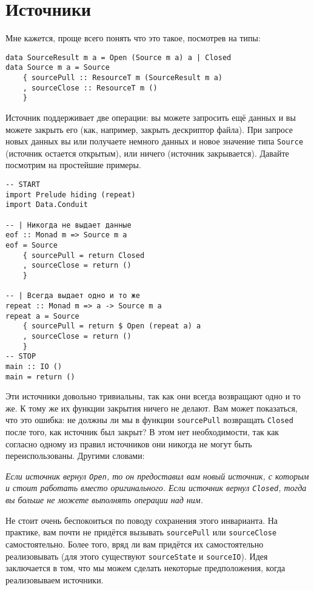 \section{Источники}

Мне кажется, проще всего понять что это такое, посмотрев на типы:
\begin{lstlisting}
data SourceResult m a = Open (Source m a) a | Closed
data Source m a = Source
    { sourcePull :: ResourceT m (SourceResult m a)
    , sourceClose :: ResourceT m ()
    }
\end{lstlisting}
Источник поддерживает две операции: вы можете запросить ещё данных и вы можете закрыть его (как,
например, закрыть дескриптор файла). При запросе новых данных вы или получаете немного
данных и новое значение типа \lstinline=Source= (источник остается открытым), или
ничего (источник закрывается). Давайте посмотрим на простейшие примеры.
\begin{lstlisting}
-- START
import Prelude hiding (repeat)
import Data.Conduit

-- | Никогда не выдает данные
eof :: Monad m => Source m a
eof = Source
    { sourcePull = return Closed
    , sourceClose = return ()
    }

-- | Всегда выдает одно и то же
repeat :: Monad m => a -> Source m a
repeat a = Source
    { sourcePull = return $ Open (repeat a) a
    , sourceClose = return ()
    }
-- STOP
main :: IO ()
main = return ()
\end{lstlisting}
Эти источники довольно тривиальны, так как они всегда возвращают одно и то же. К тому
же их функции закрытия ничего не делают. Вам может показаться, что это ошибка: не должны ли 
мы в функции \lstinline=sourcePull= возвращать \lstinline=Closed= после того, как
источник был
закрыт? В этом нет необходимости, так как согласно одному из правил
источников они никогда не могут быть переиспользованы. Другими словами:
    
\textit{Если источник вернул \lstinline=Open=, то он предоставил вам новый источник, с
которым и
стоит работать вместо оригинального. Если источник вернул \lstinline=Closed=, тогда вы
больше не можете выполнять операции над ним.}
    
Не стоит очень беспокоиться по поводу сохранения этого инварианта. На практике, вам почти
не придётся вызывать \lstinline=sourcePull= или \lstinline=sourceClose= самостоятельно.
Более того, вряд ли вам придётся их самостоятельно реализовывать (для этого существуют
\lstinline=sourceState= и \lstinline=sourceIO=).
Идея заключается в том, что мы можем сделать некоторые предположения, когда реализовываем
источники.

